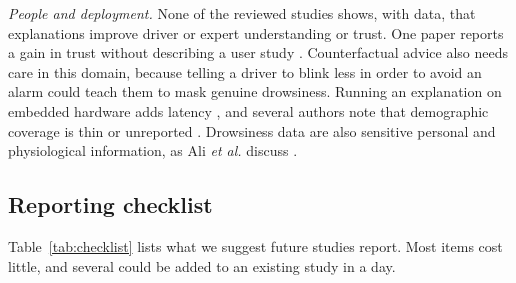 \textit{People and deployment.} None of the reviewed studies shows, with data, that explanations improve driver or expert understanding or trust. One paper reports a gain in trust without describing a user study \cite{jha2025realtime}. Counterfactual advice also needs care in this domain, because telling a driver to blink less in order to avoid an alarm could teach them to mask genuine drowsiness. Running an explanation on embedded hardware adds latency \cite{rafy2026domain}, and several authors note that demographic coverage is thin or unreported \cite{rafy2026domain,oise2026enhancing,zhu2025madfm,guan2025fatigue}. Drowsiness data are also sensitive personal and physiological information, as Ali \textit{et al.} discuss \cite{ali2026intelligent}.

\subsection{Reporting checklist}
Table~\ref{tab:checklist} lists what we suggest future studies report. Most items cost little, and several could be added to an existing study in a day.

